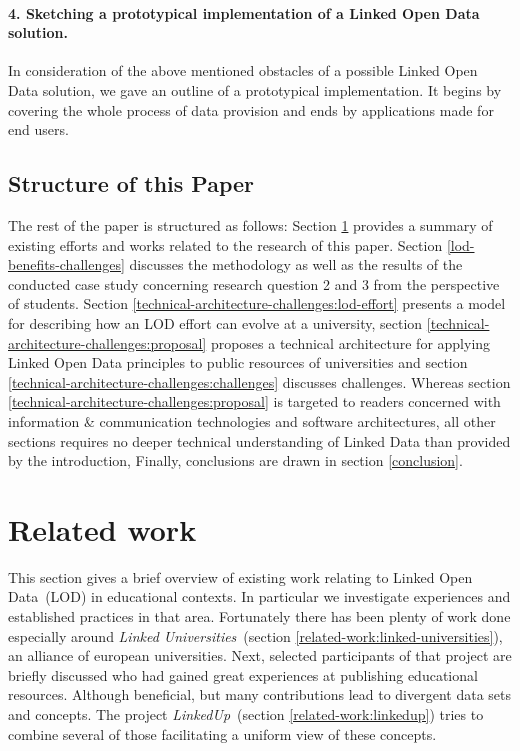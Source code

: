 \documentclass{article}
\begin{document}
\paragraph{4. Sketching a prototypical implementation of a Linked Open Data solution.}
In consideration of the above mentioned obstacles of a possible Linked Open Data solution, we gave an outline of a prototypical implementation. It begins by covering the whole process of data provision and ends by applications made for end users. 
\subsection{Structure of this Paper}
The rest of the paper is structured as follows: Section \ref{related-work} provides a summary of existing efforts and works related to the research of this paper. Section \ref{lod-benefits-challenges} discusses the methodology as well as the results of the conducted case study concerning research question 2 and 3 from the perspective of students. Section \ref{technical-architecture-challenges:lod-effort} presents a model for describing how an LOD effort can evolve at a university, section \ref{technical-architecture-challenges:proposal} proposes a technical architecture for applying Linked Open Data principles to public resources of universities and section \ref{technical-architecture-challenges:challenges} discusses challenges. Whereas section \ref{technical-architecture-challenges:proposal} is targeted to readers concerned with information \& communication technologies and software architectures, all other sections requires no deeper technical understanding of Linked Data than provided by the introduction, 
Finally, conclusions are drawn in section \ref{conclusion}.



\section{Related work}
\label{related-work}
This section gives a brief overview of existing work relating to Linked Open Data~(LOD) in educational contexts. In particular we investigate experiences and established practices in that area. Fortunately there has been plenty of work done especially around \textit{Linked Universities}~(section \ref{related-work:linked-universities}), an alliance of european universities. Next, selected participants of that project are briefly discussed who had gained great experiences at publishing educational resources. Although beneficial, but many contributions lead to divergent data sets and concepts. The project \textit{LinkedUp}~(section \ref{related-work:linkedup}) tries to combine several of those facilitating a uniform view of these concepts.
\end{document}
